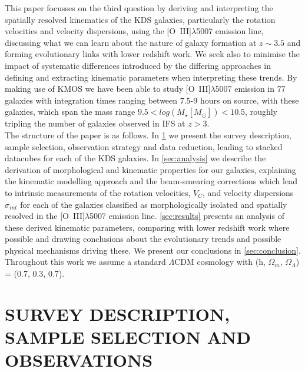 \documentclass[fleqn,usenatbib]{mn2e}
\begin{document}
This paper focusses on the third question by deriving and interpreting the spatially resolved kinematics of the KDS galaxies, particularly the rotation velocities and velocity dispersions, using the [O~{\sc III}]$\lambda$5007 emission line, discussing what we can learn about the nature of galaxy formation at $z \sim 3.5$ and forming evolutionary links with lower redshift work.
We seek also to minimise the impact of systematic differences introduced by the differing approaches in defining and extracting kinematic parameters when interpreting these trends.  
By making use of KMOS we have been able to study [O~{\sc III}]$\lambda$5007 emission in 77 galaxies with integration times ranging between 7.5-9 hours on source, with these galaxies, which span the mass range $9.5 < log(M_{\star}[M_{\odot}]) < 10.5$, roughly tripling the number of galaxies observed in IFS at $z > 3$. \\

The structure of the paper is as follows. In \cref{sec:Survey_and_data} we present the survey description, sample selection, observation strategy and data reduction, leading to stacked datacubes for each of the KDS galaxies.
In \cref{sec:analysis} we describe the derivation of morphological and kinematic properties for our galaxies, explaining the kinematic modelling approach and the beam-smearing corrections which lead to intrinsic measurements of the rotation velocities, $V_{C}$, and velocity dispersions $\sigma_{int}$ for each of the galaxies classified as morphologically isolated and spatially resolved in the [O~{\sc III}]$\lambda$5007 emission line.
\cref{sec:results} presents an analysis of these derived kinematic parameters, comparing with lower redshift work where possible and drawing conclusions about the evolutionary trends and possible physical mechanisms driving these.
We present our conclusions in \cref{sec:conclusion}.
Throughout this work we assume a standard $\Lambda$CDM cosmology with (h, $\Omega_{m}$, $\Omega_{\Lambda}$) = (0.7, 0.3, 0.7). 

\section{SURVEY DESCRIPTION, SAMPLE SELECTION AND OBSERVATIONS}\label{sec:Survey_and_data}
\end{document}
